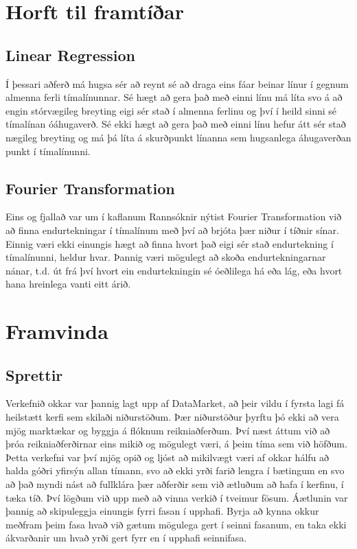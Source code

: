 \documentclass{article}
\begin{document}
\section{Horft til framtíðar}
\label{sec:future}

\subsection{Linear Regression}
Í þessari aðferð má hugsa sér að reynt sé að draga eins fáar beinar línur í
gegnum almenna ferli tímalínunnar. Sé hægt að gera það með einni línu má líta
svo á að engin stórvægileg breyting eigi sér stað í almenna ferlinu og því í
heild sinni sé tímalínan óáhugaverð. Sé ekki hægt að gera það með einni línu
hefur átt sér stað nægileg breyting og má þá líta á skurðpunkt línanna sem
hugsanlega áhugaverðan punkt í tímalínunni.

\subsection{Fourier Transformation}
Eins og fjallað var um í kaflanum Rannsóknir nýtist Fourier
Transformation við að finna endurtekningar í tímalínum með því að brjóta þær
niður í tíðnir sínar.  
Einnig væri ekki einungis hægt að finna hvort það eigi sér stað endurtekning í
tímalínunni, heldur hvar. Þannig væri mögulegt að skoða endurtekningarnar nánar,
t.d. út frá því hvort ein endurtekningin sé óeðlilega há eða lág, eða hvort hana
hreinlega vanti eitt árið.




\section{Framvinda}
\subsection{Sprettir}
Verkefnið okkar var þannig lagt upp af DataMarket, að þeir vildu í fyrsta lagi
fá heilstætt kerfi sem skilaði niðurstöðum. 
Þær niðurstöður þyrftu þó ekki að vera mjög marktækar og byggja á flóknum
reikniaðferðum. Því næst áttum við að þróa reikniaðferðirnar eins 
mikið og mögulegt væri, á þeim tíma sem við höfðum. Þetta verkefni var því mjög
opið og ljóst að mikilvægt væri 
af okkar hálfu að halda góðri yfirsýn allan tímann, svo að ekki yrði farið
lengra í bætingum en svo að það myndi nást að fullklára þær 
aðferðir sem við ætluðum að hafa í kerfinu, í tæka tíð. Því lögðum við upp með
að vinna verkið í tveimur fösum. Áætlunin var þannig að skipuleggja
einungis fyrri fasan í upphafi. Byrja að kynna okkur meðfram þeim fasa hvað við
gætum mögulega gert í seinni fasanum, en taka ekki ákvarðanir 
um hvað yrði gert fyrr en í upphafi seinnifasa.
\end{document}
